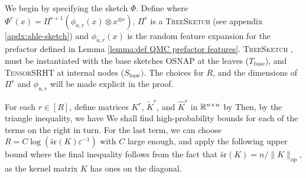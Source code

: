 \begin{theorem*}

\end{theorem*}

We begin by specifying the sketch $\Phi$. Define
where $\Phi^r(x) = \Pi^{r+1}(\phi_{u,r}(x)\otimes x^{\otimes r})$, $\Pi^{r}$ is a \textsc{TreeSketch} (see appendix \ref{apdx:ahle-sketch}) and $\phi_{u,r}(x)$ is the random feature expansion for the prefactor defined in Lemma \ref{lemma:def QMC prefactor features}. \textsc{TreeSketch} \citep{ahle2020oblivious}, must be instantiated with the base sketches \textsc{OSNAP}  \citep{nelson2013osnap} at the leaves ($T_\text{base}$), and \textsc{TensorSRHT} \citep{ahle2020oblivious} at internal nodes ($S_\text{base})$. The choices for $R$, and the dimensions of $\Pi^r$ and $\phi_{u,r}$ will be made explicit in the proof.

For each $r\in[R]$, define matrices $K^r$, $\tilde K^r$, and $\widehat K^r$ in $\mathbb{R}^{n\times n}$ by
Then, by the triangle inequality, we have
We shall find high-probability bounds for each of the terms on the right in turn. For the last term, we can choose $R=C \log(\tilde{\text{sr}}(K) \varepsilon^{-1})$ with $C$ large enough, and apply the following upper bound
where the final inequality follows from the fact that $\tilde{\text{sr}}(K) = n/\|K\|_\text{op}$, as the kernel matrix $K$ has ones on the diagonal. 

